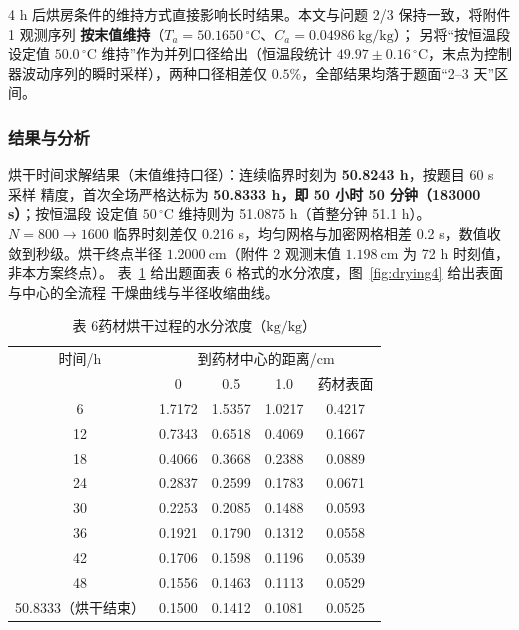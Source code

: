 4 h 后烘房条件的维持方式直接影响长时结果。本文与问题 2/3 保持一致，将附件 1 观测序列
\textbf{按末值维持}（$T_a=50.1650\,^{\circ}\mathrm{C}$、$C_a=0.04986\ \mathrm{kg/kg}$）；
另将“按恒温段设定值 $50.0\,^{\circ}\mathrm{C}$ 维持”作为并列口径给出（恒温段统计
$49.97\pm0.16\,^{\circ}\mathrm{C}$，末点为控制器波动序列的瞬时采样），两种口径相差仅
$0.5\%$，全部结果均落于题面“2–3 天”区间。

\subsubsection{结果与分析}

烘干时间求解结果（末值维持口径）：连续临界时刻为 \textbf{50.8243 h}，按题目 60 s 采样
精度，首次全场严格达标为 \textbf{50.8333 h，即 50 小时 50 分钟（183000 s）}；按恒温段
设定值 $50\,^{\circ}\mathrm{C}$ 维持则为 51.0875 h（首整分钟 51.1 h）。$N=800\to1600$
临界时刻差仅 0.216 s，均匀网格与加密网格相差 0.2 s，数值收敛到秒级。烘干终点半径
$1.2000\ \mathrm{cm}$（附件 2 观测末值 $1.198\ \mathrm{cm}$ 为 72 h 时刻值，非本方案终点）。
表~\ref{tab:C4} 给出题面表 6 格式的水分浓度，图~\ref{fig:drying4} 给出表面与中心的全流程
干燥曲线与半径收缩曲线。

\begin{table}[htbp]
  \centering
  \caption{表 6\quad 药材烘干过程的水分浓度（$\mathrm{kg/kg}$）}
  \label{tab:C4}
  \begin{tabular}{ccccc}
    \hline
    时间/h & \multicolumn{4}{c}{到药材中心的距离/cm} \\
    & 0 & 0.5 & 1.0 & 药材表面 \\
    \hline
    6  & 1.7172 & 1.5357 & 1.0217 & 0.4217 \\
    12 & 0.7343 & 0.6518 & 0.4069 & 0.1667 \\
    18 & 0.4066 & 0.3668 & 0.2388 & 0.0889 \\
    24 & 0.2837 & 0.2599 & 0.1783 & 0.0671 \\
    30 & 0.2253 & 0.2085 & 0.1488 & 0.0593 \\
    36 & 0.1921 & 0.1790 & 0.1312 & 0.0558 \\
    42 & 0.1706 & 0.1598 & 0.1196 & 0.0539 \\
    48 & 0.1556 & 0.1463 & 0.1113 & 0.0529 \\
    50.8333（烘干结束） & 0.1500 & 0.1412 & 0.1081 & 0.0525 \\
    \hline
  \end{tabular}
\end{table}


